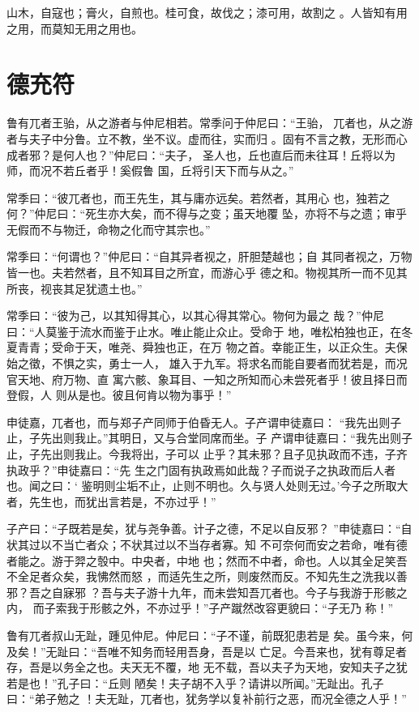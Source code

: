 \documentclass[12pt,UTF8]{ctexbook}
\begin{document}
山木，自寇也；膏火，自煎也。桂可食，故伐之；漆可用，故割之 。人皆知有用之用，而莫知无用之用也。

\section{德充符}

鲁有兀者王骀，从之游者与仲尼相若。常季问于仲尼曰：“王骀， 兀者也，从之游者与夫子中分鲁。立不教，坐不议。虚而往，实而归 。固有不言之教，无形而心成者邪？是何人也？”仲尼曰：“夫子， 圣人也，丘也直后而未往耳！丘将以为师，而况不若丘者乎！奚假鲁 国，丘将引天下而与从之。”

常季曰：“彼兀者也，而王先生，其与庸亦远矣。若然者，其用心 也，独若之何？”仲尼曰：“死生亦大矣，而不得与之变；虽天地覆 坠，亦将不与之遗；审乎无假而不与物迁，命物之化而守其宗也。”

常季曰：“何谓也？”仲尼曰：“自其异者视之，肝胆楚越也；自 其同者视之，万物皆一也。夫若然者，且不知耳目之所宜，而游心乎 德之和。物视其所一而不见其所丧，视丧其足犹遗土也。”

常季曰：“彼为己，以其知得其心，以其心得其常心。物何为最之 哉？”仲尼曰：“人莫鉴于流水而鉴于止水。唯止能止众止。受命于 地，唯松柏独也正，在冬夏青青；受命于天，唯尧、舜独也正，在万 物之首。幸能正生，以正众生。夫保始之徵，不惧之实，勇士一人， 雄入于九军。将求名而能自要者而犹若是，而况官天地、府万物、直 寓六骸、象耳目、一知之所知而心未尝死者乎！彼且择日而登假，人 则从是也。彼且何肯以物为事乎！”

申徒嘉，兀者也，而与郑子产同师于伯昏无人。子产谓申徒嘉曰： “我先出则子止，子先出则我止。”其明日，又与合堂同席而坐。子 产谓申徒嘉曰：“我先出则子止，子先出则我止。今我将出，子可以 止乎？其未邪？且子见执政而不违，子齐执政乎？”申徒嘉曰：“先 生之门固有执政焉如此哉？子而说子之执政而后人者也。闻之曰：‘ 鉴明则尘垢不止，止则不明也。久与贤人处则无过。’今子之所取大 者，先生也，而犹出言若是，不亦过乎！”

子产曰：“子既若是矣，犹与尧争善。计子之德，不足以自反邪？ ”申徒嘉曰：“自状其过以不当亡者众；不状其过以不当存者寡。知 不可奈何而安之若命，唯有德者能之。游于羿之彀中。中央者，中地 也；然而不中者，命也。人以其全足笑吾不全足者众矣，我怫然而怒 ，而适先生之所，则废然而反。不知先生之洗我以善邪？吾之自寐邪 ？吾与夫子游十九年，而未尝知吾兀者也。今子与我游于形骸之内， 而子索我于形骸之外，不亦过乎！”子产蹴然改容更貌曰：“子无乃 称！”

鲁有兀者叔山无趾，踵见仲尼。仲尼曰：“子不谨，前既犯患若是 矣。虽今来，何及矣！”无趾曰：“吾唯不知务而轻用吾身，吾是以 亡足。今吾来也，犹有尊足者存，吾是以务全之也。夫天无不覆，地 无不载，吾以夫子为天地，安知夫子之犹若是也！”孔子曰：“丘则 陋矣！夫子胡不入乎？请讲以所闻。”无趾出。孔子曰：“弟子勉之 ！夫无趾，兀者也，犹务学以复补前行之恶，而况全德之人乎！”
\end{document}
